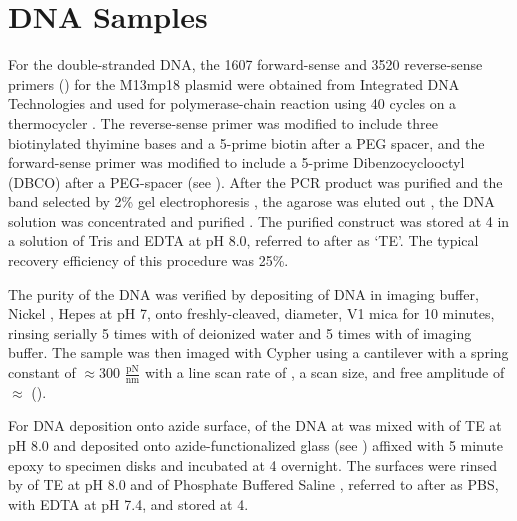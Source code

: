 \section{DNA Samples}

For the  double-stranded DNA, the 1607 forward-sense and 3520 reverse-sense primers () for the M13mp18 plasmid  were obtained from Integrated DNA Technologies  and used for polymerase-chain reaction  using 40 cycles on a thermocycler . The reverse-sense primer was modified to include three biotinylated thyimine bases and a 5-prime biotin after a PEG spacer, and the forward-sense primer was modified to include a 5-prime Dibenzocyclooctyl (DBCO) after a PEG-spacer (see ). After the PCR product was purified  and the  band selected by 2\% gel electrophoresis , the agarose was eluted out , the DNA solution was concentrated  and purified . The purified construct was stored at 4\degreeC{} in a solution of  Tris  and  EDTA  at pH 8.0, referred to after as `TE'. The typical recovery efficiency of this procedure was 25\%. 

The purity of the DNA was verified by depositing  of DNA in imaging buffer,  Nickel ,  Hepes  at pH 7, onto freshly-cleaved,  diameter, V1 mica  for 10 minutes, rinsing serially 5 times with  of deionized water and 5 times with  of imaging buffer. The sample was then imaged with Cypher using a cantilever with a spring constant of $\approx$300 $\frac{\text{pN}}{\text{nm}}$  with a line scan rate of , a  scan size, and free amplitude of $\approx$ (). 

For DNA deposition onto azide surface,  of the DNA at  was mixed with  of TE at pH 8.0 and deposited onto azide-functionalized glass (see ) affixed with 5 minute epoxy  to specimen disks  and incubated at 4\degreeC{} overnight. The surfaces were rinsed by  of TE at pH 8.0 and  of Phosphate Buffered Saline , referred to after as PBS, with  EDTA at pH 7.4, and stored at 4\degreeC{}. 

